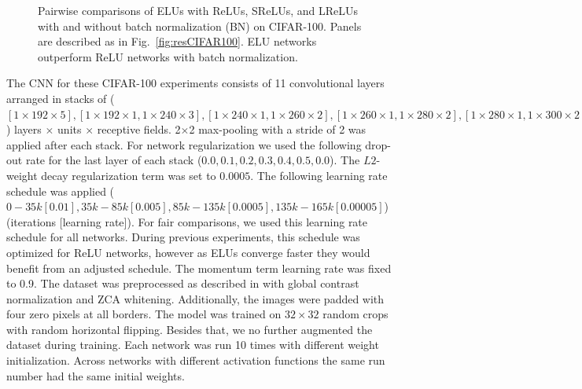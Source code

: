 \documentclass{article}
\begin{document}
\begin{figure}[!ht]
\begin{center}
\caption{Pairwise comparisons of ELUs with ReLUs, SReLUs, and LReLUs with and without
batch normalization (BN) on CIFAR-100. Panels are described as in
Fig.~\ref{fig:resCIFAR100}.
ELU networks outperform ReLU networks with batch normalization.
\label{fig:resCIFAR100_BN}}
\end{center}
\vspace*{-5pt}
\end{figure}



The CNN for these CIFAR-100
experiments consists of 11 convolutional layers arranged in stacks of
($[1\times192\times5], [1\times192\times1, 1\times240\times3],
[1\times240\times1, 1\times260\times2], [1\times260\times1,1\times280\times2],
[1\times280\times1,1\times300\times2], [1\times300\times1],
[1\times100\times1]$)
layers $\times$ units $\times$ receptive fields.
2$\times$2 max-pooling with a stride of 2 was applied after each
stack.  For network regularization we used the following drop-out rate
for the last layer of each stack ($0.0, 0.1, 0.2, 0.3, 0.4, 0.5,
0.0$). The $L2$-weight decay regularization term was set to $0.0005$.
The following learning rate schedule was applied ($0-35k [0.01],
35k-85k [0.005], 85k-135k [0.0005], 135k-165k [0.00005]$) (iterations [learning rate]).
For fair comparisons, we used this
learning rate schedule for all networks.
During previous experiments, this schedule was
optimized for ReLU networks, however as ELUs converge faster they
would benefit from an adjusted schedule.
The momentum term learning rate was fixed to 0.9.
The dataset was preprocessed as described in \citet{Goodfellow:13}
with global contrast normalization and ZCA whitening.
Additionally, the images were padded with
four zero pixels at all borders.
The model was trained on $32\times32$ random crops with random
horizontal flipping.
Besides that, we no further augmented the dataset during training.
Each network was run 10 times with different weight initialization.
Across networks with different activation functions the same run number
had the same initial weights.
\end{document}

